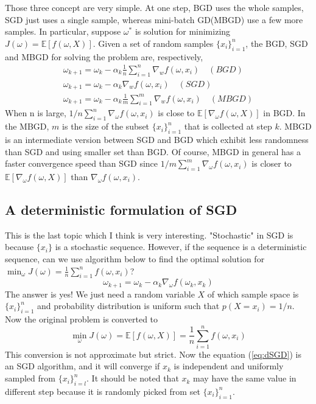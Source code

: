     Those three concept are very simple. At one step, BGD uses the whole samples, SGD just uses a single sample, whereas
    mini-batch GD(MBGD) use a few more samples. In particular, suppose $\omega^{*}$ is solution for minimizing
    $J(\omega)=\mathbb{E}[f(\omega,X)]$. Given a set of random samples $\{x_{i}\}_{i=1}^{n}$, the BGD, SGD and MBGD for
    solving the problem are, respectively,
    \begin{align*}
      \omega_{k+1} = \omega_{k} - \alpha_{k}\frac{1}{n}\sum_{i=1}^{n}\nabla_{w}f(\omega,x_{i}) \quad (BGD) \\
      \omega_{k+1} = \omega_{k} - \alpha_{k}\nabla_{w}f(\omega,x_{i}) \quad (SGD)                          \\
      \omega_{k+1} = \omega_{k} - \alpha_{k}\frac{1}{m}\sum_{i=1}^{m}\nabla_{w}f(\omega,x_{i}) \quad (MBGD)
    \end{align*}
    When n is large, $1/n \sum_{i=1}^{n} \nabla_{\omega}f(\omega,x_{i})$ is close to $\mathbb{E}[\nabla_{\omega}f(\omega,
        X)]$ in BGD. In the MBGD, $m$ is the size of the subset $\{x_{i}\}_{i=1}^{n}$ that is collected at step $k$. MBGD is
    an intermediate version between SGD and BGD which exhibit less randomness than SGD and using smaller set than BGD. Of
    course, MBGD in general has a faster convergence speed than SGD since $1/m \sum_{i=1}^{m}
      \nabla_{\omega}f(\omega,x_{i})$ is closer to $\mathbb{E}[\nabla_{\omega}f(\omega, X)]$ than
    $\nabla_{\omega}f(\omega,x_{i})$.

  \subsection{A deterministic formulation of SGD}

    This is the last topic which I think is very interesting. "Stochastic" in SGD is because $\{x_{i}\}$ is a stochastic
    sequence. However, if the sequence is a deterministic sequence, can we use algorithm below to find the optimal solution
    for $\min_{\omega} J(\omega) = \frac{1}{n}\sum_{i=1}^{n}f(\omega,x_{i})$?
    \begin{equation}
      \label{eq:dSGD}
      \omega_{k+1} = \omega_{k} - \alpha_{k} \nabla_{\omega}f(\omega_{k},x_{k})
    \end{equation}
    The answer is yes! We just need a random variable $X$ of which sample space is $\{x_{i}\}_{i=1}^{n}$ and probability
    distribution is uniform such that $p(X=x_{i})=1/n$. Now the original problem is converted to
    \begin{equation*}
      \min_{\omega} J(\omega) = \mathbb{E}[f(\omega,X)] = \frac{1}{n}\sum_{i=1}^{n}f(\omega,x_{i})
    \end{equation*}
    This conversion is not approximate but  strict. Now the equation (\ref{eq:dSGD}) is an SGD algorithm, and it will
    converge if $x_{k}$ is independent and uniformly sampled from $\{x_{i}\}_{i=l}^{n}$. It should be noted that $x_{k}$ may
    have the same value in different step because it is randomly picked from set $\{x_{i}\}_{i=1}^{n}$.  
